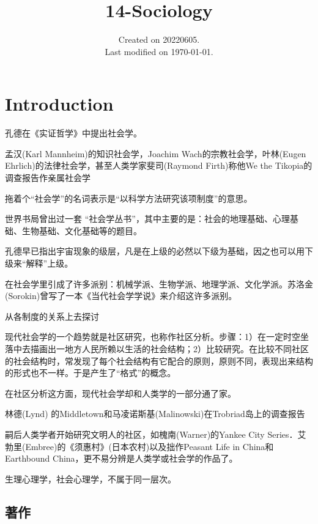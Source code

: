 \documentclass[UTF8]{../RepresentationUniverse}
\begin{document}
\title{14-Sociology}
\date{Created on 20220605.\\   Last modified on \today.}
\maketitle
\tableofcontents


\chapter{Introduction}

孔德在《实证哲学》中提出社会学。

孟汉(Karl Mannheim)的知识社会学，Joachim Wach的宗教社会学，叶林(Eugen Ehrlich)的法律社会学，甚至人类学家斐司(Raymond Firth)称他We the Tikopia的调查报告作亲属社会学


拖着个“社会学”的名词表示是“以科学方法研究该项制度”的意思。


世界书局曾出过一套 “社会学丛书”，其中主要的是：社会的地理基础、心理基础、生物基础、文化基础等的题目。


孔德早已指出宇宙现象的级层，凡是在上级的必然以下级为基础，因之也可以用下级来“解释”上级。


在社会学里引成了许多派别：机械学派、生物学派、地理学派、文化学派。苏洛金 (Sorokin)曾写了一本《当代社会学学说》来介绍这许多派别。


从各制度的关系上去探讨


现代社会学的一个趋势就是社区研究，也称作社区分析。步骤：1）在一定时空坐落中去描画出一地方人民所赖以生活的社会结构；2）比较研究。在比较不同社区的社会结构时，常发现了每个社会结构有它配合的原则，原则不同，表现出来结构的形式也不一样。于是产生了“格式”的概念。

在社区分析这方面，现代社会学却和人类学的一部分通了家。


林德(Lynd) 的Middletown和马凌诺斯基(Malinowski)在Trobriad岛上的调查报告

嗣后人类学者开始研究文明人的社区，如槐南(Warner)的Yankee City Series．艾勃里(Embree)的《须惠村》(日本农村)以及拙作Peasant Life in China和Earthbound China，更不易分辨是人类学或社会学的作品了。


生理心理学，社会心理学，不属于同一层次。

\section{著作}
\end{document}
